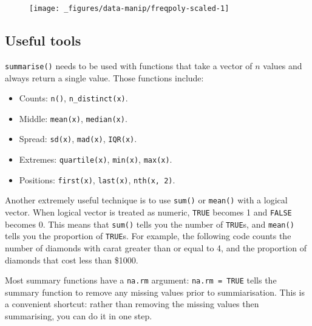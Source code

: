 \begin{figure}[H]
  \centering
  \texttt{[image: \_figures/data-manip/freqpoly-scaled-1]}
\end{figure}

\subsection{Useful tools}

\texttt{summarise()} needs to be used with functions that take a vector
of \(n\) values and always return a single value. Those functions
include:

\begin{itemize}
\tightlist
\item
  Counts: \texttt{n()}, \texttt{n\_distinct(x)}.
\item
  Middle: \texttt{mean(x)}, \texttt{median(x)}.
\item
  Spread: \texttt{sd(x)}, \texttt{mad(x)}, \texttt{IQR(x)}.
\item
  Extremes: \texttt{quartile(x)}, \texttt{min(x)}, \texttt{max(x)}.
\item
  Positions: \texttt{first(x)}, \texttt{last(x)}, \texttt{nth(x,\ 2)}.
\end{itemize}

Another extremely useful technique is to use \texttt{sum()} or
\texttt{mean()} with a logical vector. When logical vector is treated as
numeric, \texttt{TRUE} becomes 1 and \texttt{FALSE} becomes 0. This
means that \texttt{sum()} tells you the number of \texttt{TRUE}s, and
\texttt{mean()} tells you the proportion of \texttt{TRUE}s. For example,
the following code counts the number of diamonds with carat greater than
or equal to 4, and the proportion of diamonds that cost less than
\$1000.

\begin{Shaded}
\begin{Highlighting}[]
   \StringTok{ }\NormalTok{), }
   \StringTok{ }\NormalTok{)}
\NormalTok{)}
\CommentTok{#> }
\end{Highlighting}
\end{Shaded}

Most summary functions have a \texttt{na.rm} argument:
\texttt{na.rm\ =\ TRUE} tells the summary function to remove any missing
values prior to summiarisation. This is a convenient shortcut: rather
than removing the missing values then summarising, you can do it in one
step.


